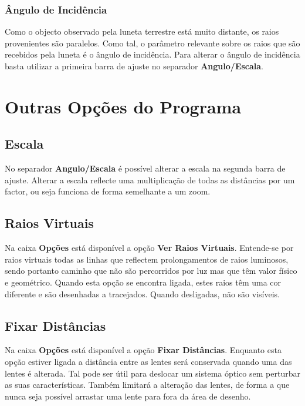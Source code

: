 \documentclass[a4paper,12pt]{article}
\begin{document}
\subsubsection{Ângulo de Incidência}
Como o objecto observado pela luneta terrestre está muito distante, os raios provenientes são paralelos. Como tal, o parâmetro relevante sobre os raios que são recebidos pela luneta é o ângulo de incidência. Para alterar o ângulo de incidência basta utilizar a primeira barra de ajuste no separador {\bf Angulo/Escala}.

\pagebreak

\section{Outras Opções do Programa}

\subsection{Escala}

No separador {\bf Angulo/Escala} é possível alterar a escala na segunda barra de ajuste. Alterar a escala reflecte uma multiplicação de todas as distâncias por um factor, ou seja funciona de forma semelhante a um zoom.
\par

\subsection{Raios Virtuais}

Na caixa {\bf Opções} está disponível a opção {\bf Ver Raios Virtuais}. Entende-se por raios virtuais todas as linhas que reflectem prolongamentos de raios luminosos, sendo portanto caminho que não são percorridos por luz mas que têm valor físico e geométrico. Quando esta opção se encontra ligada, estes raios têm uma cor diferente e são desenhadas a tracejados. Quando desligadas, não são visíveis.
\par

\subsection{Fixar Distâncias}
Na caixa {\bf Opções} está disponível a opção {\bf Fixar Distâncias}. Enquanto esta opção estiver ligada a distância entre as lentes será conservada quando uma das lentes é alterada. Tal pode ser útil para deslocar um sistema óptico sem perturbar as suas características. Também limitará a alteração das lentes, de forma a que nunca seja possível arrastar uma lente para fora da área de desenho.
\par
\end{document}
